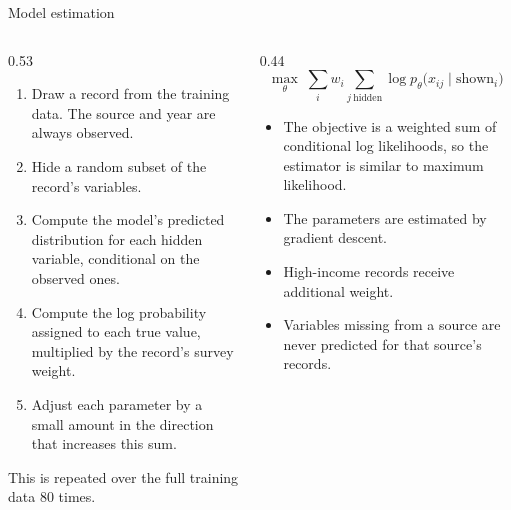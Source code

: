 \documentclass[11pt,aspectratio=169]{beamer}
\begin{document}
\begin{frame}{Model estimation}
  \begin{columns}[T]
    \begin{column}{0.53\textwidth}
      \footnotesize
      \begin{enumerate}
        \item Draw a record from the training data. The source and year are always observed.
        \item Hide a random subset of the record's variables.
        \item Compute the model's predicted distribution for each hidden variable, conditional on the observed ones.
        \item Compute the log probability assigned to each true value, multiplied by the record's survey weight.
        \item Adjust each parameter by a small amount in the direction that increases this sum.
      \end{enumerate}
      \vspace{0.3em}
      This is repeated over the full training data 80 times.
    \end{column}
    \begin{column}{0.44\textwidth}
      \small
      \[
        \max_{\theta}\; \sum_{i} w_i \!\!\sum_{j\ \text{hidden}}\!\! \log p_\theta\big(x_{ij} \mid \text{shown}_i\big)
      \]
      \vspace{0.2em}
      \begin{itemize}
        \footnotesize
        \item The objective is a weighted sum of conditional log likelihoods, so the estimator is similar to maximum likelihood.
        \item The parameters are estimated by gradient descent.
        \item High-income records receive additional weight.
        \item Variables missing from a source are never predicted for that source's records.
      \end{itemize}
    \end{column}
  \end{columns}
\end{frame}
\end{document}
